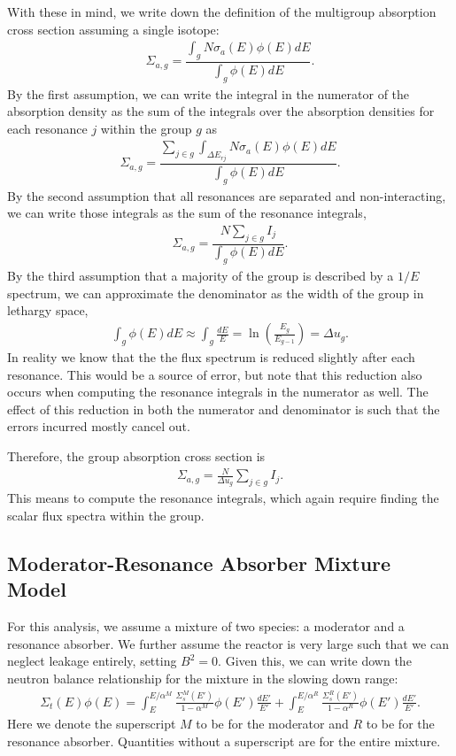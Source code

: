 With these in mind, we write down the definition of the multigroup absorption cross section assuming a single isotope:
\begin{align}
  \Sigma_{a,g} = \dfrac{ \displaystyle\int_g N \sigma_a(E) \phi(E) dE }{ \displaystyle\int_g \phi(E) dE } .
\end{align}
By the first assumption, we can write the integral in the numerator of the absorption density as the sum of the integrals over the absorption densities for each resonance $j$ within the group $g$ as
\begin{align}
  \Sigma_{a,g} = \dfrac{ \displaystyle\sum_{j \in g} \int_{\Delta E_{rj}} N \sigma_a(E) \phi(E) dE }{ \displaystyle\int_g \phi(E) dE } .
\end{align}
By the second assumption that all resonances are separated and non-interacting, we can write those integrals as the sum of the resonance integrals,
\begin{align}
  \Sigma_{a,g} = \dfrac{ N \displaystyle\sum_{j \in g} I_j }{ \displaystyle\int_g \phi(E) dE } .
\end{align}
By the third assumption that a majority of the group is described by a $1/E$ spectrum, we can approximate the denominator as the width of the group in lethargy space,
\begin{align}
   \int_g \phi(E) dE \approx \int_g \frac{dE}{E} = \ln\left( \frac{E_{g}}{E_{g-1}} \right) = \Delta u_g .
\end{align}
In reality we know that the the flux spectrum is reduced slightly after each resonance. This would be a source of error, but note that this reduction also occurs when computing the resonance integrals in the numerator as well. The effect of this reduction in both the numerator and denominator is such that the errors incurred mostly cancel out.

Therefore, the group absorption cross section is
\begin{align}
  \Sigma_{a,g} = \frac{N}{\Delta u_g} \displaystyle\sum_{j \in g} I_j .
\end{align}
This means to compute the resonance integrals, which again require finding the scalar flux spectra within the group. 

\subsection{Moderator-Resonance Absorber Mixture Model}

For this analysis, we assume a mixture of two species: a moderator and a resonance absorber. We further assume the reactor is very large such that we can neglect leakage entirely, setting $B^2 = 0$. Given this, we can write down the neutron balance relationship for the mixture in the slowing down range:
\begin{align}
  \Sigma_t(E) \phi(E) = \int_E^{E/\alpha^M} \frac{\Sigma_s^M(E')}{ 1 - \alpha^M } \phi(E') \frac{dE'}{E'} + \int_E^{E/\alpha^R} \frac{\Sigma_s^R(E')}{ 1 - \alpha^R } \phi(E') \frac{dE'}{E'} .
\end{align}
Here we denote the superscript $M$ to be for the moderator and $R$ to be for the resonance absorber. Quantities without a superscript are for the entire mixture.

